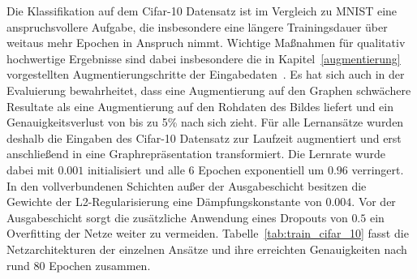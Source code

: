 Die Klassifikation auf dem \gls{Cifar}-10 Datensatz ist im Vergleich zu \gls{MNIST} eine anspruchsvollere Aufgabe, die insbesondere eine längere Trainingsdauer über weitaus mehr Epochen in Anspruch nimmt.
Wichtige Maßnahmen für qualitativ hochwertige Ergebnisse sind dabei insbesondere die in Kapitel~\ref{augmentierung} vorgestellten Augmentierungschritte der Eingabedaten~\cite{tensorflow}.
Es hat sich auch in der Evaluierung bewahrheitet, dass eine Augmentierung auf den Graphen schwächere Resultate als eine Augmentierung auf den Rohdaten des Bildes liefert und ein Genauigkeitsverlust von bis zu 5\% nach sich zieht.
Für alle Lernansätze wurden deshalb die Eingaben des \gls{Cifar}-10 Datensatz zur Laufzeit augmentiert und erst anschließend in eine Graphrepräsentation transformiert.
Die Lernrate wurde dabei mit $0.001$ initialisiert und alle 6 Epochen exponentiell um $0.96$ verringert.
In den vollverbundenen Schichten außer der Ausgabeschicht besitzen die Gewichte \bzgl{} der L2-Regularisierung eine Dämpfungskonstante von $0.004$.
Vor der Ausgabeschicht sorgt die zusätzliche Anwendung eines Dropouts von $0.5$ ein Overfitting der Netze weiter zu vermeiden.
Tabelle~\ref{tab:train_cifar_10} fasst die Netzarchitekturen der einzelnen Ansätze und ihre erreichten Genauigkeiten nach rund 80 Epochen zusammen.
\begin{table}[t]
\centering
{}
\caption[Testgenauigkeiten der \gls{Cifar}-10 Superpixelrepräsentationen]{Testgenauigkeiten eines Trainings auf den durch \gls{SLIC} und Quickshift zur Laufzeit generierten Graphrepräsentationen des \gls{Cifar}-10 Datensatz nach 80 Epochen im Vergleich zu einer ähnlichen klassischen Netzarchitektur auf den Bildrohdaten.}
\label{tab:train_cifar_10}
\end{table}
